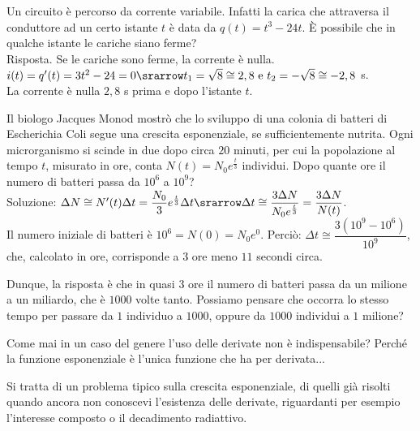 \begin{esempio}
Un circuito è percorso da corrente variabile. Infatti la carica che 
attraversa il conduttore ad un certo istante \(t\) è data da \(q(t)=t^3-24t\).
È possibile che in qualche istante le cariche siano ferme?\\
Risposta. Se le cariche sono ferme, la corrente è nulla.\\ 
\(i(t)=q'(t)=3t^2-24=0\srarrow t_1=\sqrt{8}\cong 2,8
\mbox{  e } t_2=-\sqrt{8} \cong -2,8\) s.\\
La corrente è nulla \(2,8\) s prima e dopo l'istante \(t\).
\end{esempio}

\begin{esempio}
Il biologo Jacques Monod mostrò che lo sviluppo di una colonia di batteri 
di Escherichia Coli segue una crescita esponenziale, se sufficientemente 
nutrita. Ogni microrganismo si scinde in due dopo circa \(20\) minuti, per cui 
la popolazione al tempo \(t\), misurato in ore, conta 
\(N(t)=N_0e^{\frac{t}{3}}\)
individui. Dopo quante ore il numero di batteri passa da \(10^6\) a \(10^9\)?\\
Soluzione: \(\Delta N\cong N'(t)\Delta t=\dfrac{N_0}{3}e^{\frac{t}{3}}\Delta t
\srarrow \Delta t\cong\dfrac{3\Delta N}{N_0e^{\frac{t}{3}}}=\dfrac{3\Delta N}
{N(t)}\).\\
Il numero iniziale di batteri è \(10^6=N(0)=N_0e^0\). Perciò:
\(\Delta t\cong\dfrac{3(10^9-10^6)}{10^9}\), che, calcolato in ore,  
corrisponde 
a 
3 ore meno \(11\) secondi circa.

\begin{osservazione}
Dunque, la risposta è che in quasi \(3\) ore il numero di batteri passa da un 
milione a un miliardo, che è \(1000\) volte tanto. Possiamo pensare che 
occorra lo stesso tempo per passare da \(1\) individuo a \(1000\), oppure da 
\(1000\) individui a \(1\) milione?
\end{osservazione}
\begin{osservazione}
Come mai in un caso del genere l'uso delle derivate non è indispensabile? 
Perché la funzione esponenziale è l'unica funzione che ha per derivata...
\end{osservazione}
\begin{osservazione}
Si tratta di un problema tipico sulla crescita esponenziale, di quelli già 
risolti quando ancora non conoscevi l'esistenza delle derivate, riguardanti
per esempio l'interesse composto o il decadimento radiattivo.
\end{osservazione}

\end{esempio}

